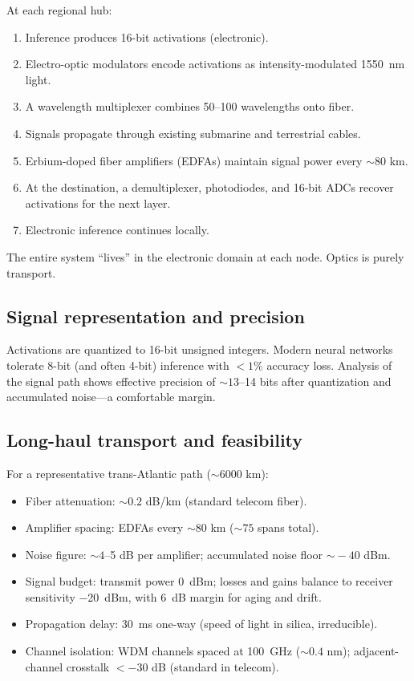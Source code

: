 \documentclass[12pt]{article}
\begin{document}
At each regional hub:
\begin{enumerate}[leftmargin=1.6em,itemsep=2pt]
  \item Inference produces 16-bit activations (electronic).
  \item Electro-optic modulators encode activations as intensity-modulated
  \SI{1550}{nm} light.
  \item A wavelength multiplexer combines 50--100 wavelengths onto fiber.
  \item Signals propagate through existing submarine and terrestrial cables.
  \item Erbium-doped fiber amplifiers (EDFAs) maintain signal power every
  \(\sim\!80\) km.
  \item At the destination, a demultiplexer, photodiodes, and 16-bit ADCs
  recover activations for the next layer.
  \item Electronic inference continues locally.
\end{enumerate}

\noindent The entire system ``lives'' in the electronic domain at each node. Optics is
purely transport.

\subsection{Signal representation and precision}

Activations are quantized to 16-bit unsigned integers. Modern neural networks
tolerate 8-bit (and often 4-bit) inference with $<1\%$ accuracy loss. Analysis of
the signal path shows effective precision of \(\sim\!13\)--14 bits after
quantization and accumulated noise---a comfortable margin.

\subsection{Long-haul transport and feasibility}

For a representative trans-Atlantic path (\(\sim\!6000\) km):
\begin{itemize}[leftmargin=1.6em,itemsep=2pt]
  \item Fiber attenuation: \(\sim\!0.2\) dB/km (standard telecom fiber).
  \item Amplifier spacing: EDFAs every \(\sim\!80\) km (\(\sim\!75\) spans total).
  \item Noise figure: \(\sim\!4\)--5 dB per amplifier; accumulated noise floor
  \(\sim\!-40\) dBm.
  \item Signal budget: transmit power \SI{+0}{dBm}; losses and gains balance
  to receiver sensitivity \SI{-20}{dBm}, with \SI{+6}{dB} margin for aging and
  drift.
  \item Propagation delay: \SI{30}{ms} one-way (speed of light in silica,
  irreducible).
  \item Channel isolation: WDM channels spaced at \SI{100}{GHz} (\(\sim\!0.4\) nm);
  adjacent-channel crosstalk $<-30$ dB (standard in telecom).
\end{itemize}
\end{document}
